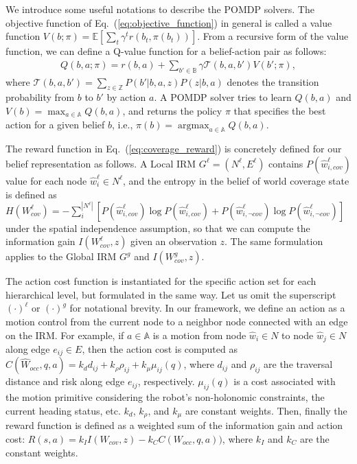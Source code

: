 \documentclass[letterpaper]{article} %
\newcommand{\phdone}[1]{} %
\newcommand{\argmax}{\mathop{\mathrm{argmax}}}
\begin{document}
\phdone{General POMDP Solver Formulation}
We introduce some useful notations to describe the POMDP solvers.
The objective function of Eq.~(\ref{eq:objective_function}) in general is called a value function $V(b; \pi) = \mathbb{E} [\sum_t \gamma^t r(b_t, \pi(b_t))]$.
%
From a recursive form of the value function, we can define a Q-value function for a belief-action pair as follows:
\begin{align}
  Q(b, a; \pi) = r(b, a) + \sum_{b' \in \mathbb{B}} \gamma \mathcal{T}(b, a, b') V(b'; \pi),
  \label{eq:q_function}
\end{align}
where $\mathcal{T}(b, a, b') = \sum_{z \in \mathbb{Z}} P(b' | b, a, z) P(z | b, a)$ denotes the transition probability from $b$ to $b'$ by action $a$.
%
A POMDP solver tries to learn $Q(b, a)$ and $V(b) = \max_{a \in \mathbb{A}} Q(b, a)$, and returns the policy $\pi$ that specifies the best action for a given belief $b$, i.e., $\pi(b) = \argmax_{a \in \mathbb{A}} Q(b, a)$.


\phdone{Reward Function--Information Gain}
The reward function in Eq.~(\ref{eq:coverage_reward}) is concretely defined for our belief representation as follows.
A Local IRM $G^\ell = (N^\ell, E^\ell)$ contains $P(\hat{w}^\ell_{i,cov})$ value for each node $\hat{w}^\ell_i \in N^\ell$,
and the entropy in the belief of world coverage state is defined as 
$H(W^\ell_{cov}) = - \sum_{i}^{|N^\ell|} [ P(\hat{w}^\ell_{i,cov}) \log P(\hat{w}^\ell_{i,cov}) + P(\hat{w}^\ell_{i,\neg cov}) \log P(\hat{w}^\ell_{i,\neg cov}) ]$ under the spatial independence assumption,
so that we can compute the information gain $I(W^\ell_{cov}, z)$ given an observation $z$.
The same formulation applies to the Global IRM $G^g$ and $I(W^g_{cov}, z)$.


\phdone{Reward Function--Action Cost}
The action cost function is instantiated for the specific action set for each hierarchical level, but formulated in the same way.
Let us omit the superscript $(\cdot)^\ell$ or $(\cdot)^g$ for notational brevity.
In our framework, we define an action as a motion control from the current node to a neighbor node connected with an edge on the IRM.
For example, if $a \in \mathbb{A}$ is a motion from node $\hat{w}_i \in N$ to node $\hat{w}_j \in N$ along edge $e_{ij} \in E$, then the action cost is computed as
$C(\hat{W}_{occ}, q, a) = k_d d_{ij} + k_\rho \rho_{ij} + k_\mu \mu_{ij}(q)$,
where $d_{ij}$ and $\rho_{ij}$ are the traversal distance and risk along edge $e_{ij}$, respectively.
$\mu_{ij}(q)$ is a cost associated with the motion primitive considering the robot's non-holonomic constraints, the current heading status, etc.
$k_d$, $k_\rho$, and $k_\mu$ are constant weights.
Then, finally the reward function is defined as a weighted sum of the information gain and action cost:
$R(s, a) = k_I I(W_{cov}, z) - k_C C(W_{occ}, q, a))$,
where $k_I$ and $k_C$ are the constant weights.
\end{document}
